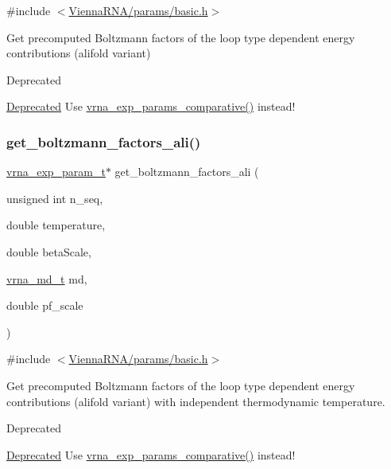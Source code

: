 {\ttfamily \#include $<$\mbox{\hyperlink{params_2basic_8h}{Vienna\+R\+N\+A/params/basic.\+h}}$>$}



Get precomputed Boltzmann factors of the loop type dependent energy contributions (alifold variant) 

\begin{DoxyRefDesc}{Deprecated}
\item[\mbox{\hyperlink{deprecated__deprecated000145}{Deprecated}}]Use \mbox{\hyperlink{group__energy__parameters_gaf78c09e685e6eef4100b1a41d4042550}{vrna\+\_\+exp\+\_\+params\+\_\+comparative()}} instead!\end{DoxyRefDesc}
\mbox{\label{group__energy__parameters_ga2aa1d87c97f35d2e4121634a17556829}} 
\subsubsection{\texorpdfstring{get\_boltzmann\_factors\_ali()}{get\_boltzmann\_factors\_ali()}}
{\footnotesize\ttfamily \mbox{\hyperlink{group__energy__parameters_ga01d8b92fe734df8d79a6169482c7d8d8}{vrna\+\_\+exp\+\_\+param\+\_\+t}}$\ast$ get\+\_\+boltzmann\+\_\+factors\+\_\+ali (\begin{DoxyParamCaption}\item[{unsigned int}]{n\+\_\+seq,  }\item[{double}]{temperature,  }\item[{double}]{beta\+Scale,  }\item[{\mbox{\hyperlink{group__model__details_ga1f8a10e12a0a1915f2a4eff0b28ea17c}{vrna\+\_\+md\+\_\+t}}}]{md,  }\item[{double}]{pf\+\_\+scale }\end{DoxyParamCaption})}



{\ttfamily \#include $<$\mbox{\hyperlink{params_2basic_8h}{Vienna\+R\+N\+A/params/basic.\+h}}$>$}



Get precomputed Boltzmann factors of the loop type dependent energy contributions (alifold variant) with independent thermodynamic temperature. 

\begin{DoxyRefDesc}{Deprecated}
\item[\mbox{\hyperlink{deprecated__deprecated000146}{Deprecated}}]Use \mbox{\hyperlink{group__energy__parameters_gaf78c09e685e6eef4100b1a41d4042550}{vrna\+\_\+exp\+\_\+params\+\_\+comparative()}} instead!\end{DoxyRefDesc}
\mbox{\label{group__energy__parameters_ga541f2cf7436e9bc939b0a49b24baf987}} 
